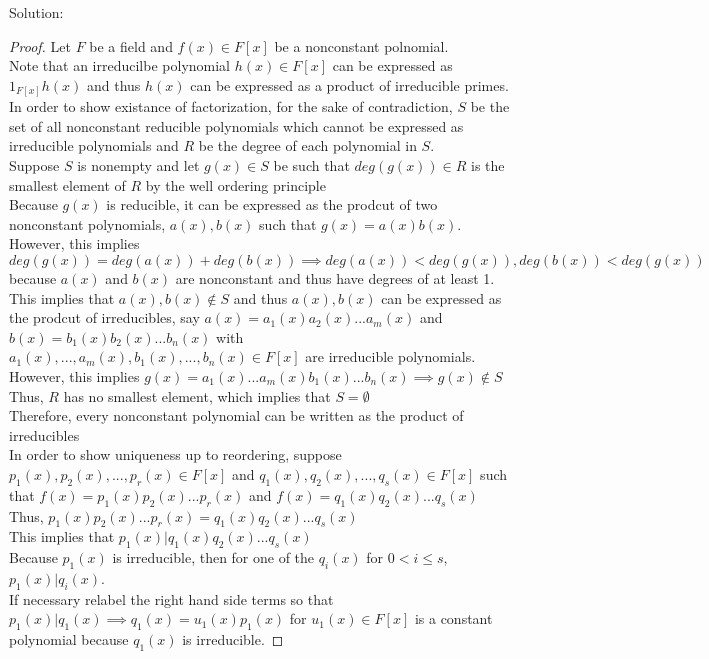 \documentclass{article} %
\begin{document}
Solution: 
\begin{addmargin}[1em]{0em}
\begin{proof}
Let $F$ be a field and $f(x) \in F[x]$ be a nonconstant polnomial.
\\Note that an irreducilbe polynomial $h(x) \in F[x]$ can be expressed as $1_{F[x]}h(x)$ and thus $h(x)$ can be expressed as a product of irreducible primes.
\\In order to show existance of factorization, for the sake of contradiction, $S$ be the set of all nonconstant reducible polynomials which cannot be expressed as irreducible polynomials and $R$ be the degree of each polynomial in $S$.
\\Suppose $S$ is nonempty and let $g(x) \in S$ be such that $deg(g(x)) \in R$ is the smallest element of $R$ by the well ordering principle
\\Because $g(x)$ is reducible, it can be expressed as the prodcut of two nonconstant polynomials, $a(x),b(x)$ such that $g(x) = a(x)b(x)$.
\\However, this implies $deg(g(x)) = deg(a(x)) + deg(b(x)) \implies deg(a(x)) < deg(g(x)), deg(b(x)) < deg(g(x))$ because $a(x)$ and $b(x)$ are nonconstant and thus have degrees of at least 1.
\\This implies that $a(x), b(x) \not\in S$ and thus $a(x), b(x)$ can be expressed as the prodcut of irreducibles, say $a(x) = a_1(x)a_2(x)...a_m(x)$ and $b(x) = b_1(x)b_2(x)...b_n(x)$ with $a_1(x),...,a_m(x),b_1(x),...,b_n(x) \in F[x]$ are irreducible polynomials.
\\However, this implies $g(x) = a_1(x)...a_m(x)b_1(x)...b_n(x) \implies g(x) \not\in S$
\\Thus, $R$ has no smallest element, which implies that $S = \emptyset$
\\Therefore, every nonconstant polynomial can be written as the product of irreducibles
\\In order to show uniqueness up to reordering, suppose $p_1(x),p_2(x), ... ,p_r(x) \in F[x]$ and $q_1(x),q_2(x), ... ,q_s(x) \in F[x]$ such that  $f(x) = p_1(x)p_2(x) ... p_r(x)$ and $f(x) = q_1(x)q_2(x) ... q_s(x) $
\\Thus, $p_1(x)p_2(x)...p_r(x) = q_1(x)q_2(x)...q_s(x)$
\\This implies that $p_1(x)|q_1(x)q_2(x)...q_s(x)$
\\Because $p_1(x)$ is irreducible, then for one of the $q_i(x)$ for $0< i \leq s$, $p_1(x)|q_i(x)$.
\\If necessary relabel the right hand side terms so that $p_1(x)|q_1(x) \implies q_1(x) = u_1(x)p_1(x)$ for $u_1(x) \in F[x]$ is a constant polynomial because $q_1(x)$ is irreducible.

\end{proof}
\end{addmargin}
\end{document}

